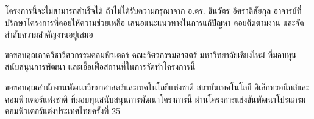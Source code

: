   
  \iffalse
    \begin{dedication}
      This document is dedicated to all Chiang Mai University students.
      
      Dedication page is optional.
    \end{dedication}
  \fi %
  
  \begin{acknowledgments}
    โครงการนี้จะไม่สามารถสำเร็จได้ ถ้าไม่ได้รับความกรุณาจาก อ.ดร. ชินวัตร อิศราดิสัยกุล 
    อาจารย์ที่ปรึกษาโครงการที่คอยให้ความช่วยเหลือ เสนอแนะแนวทางในการแก้ปัญหา 
    คอยติดตามงาน และจัดลำดับความสำคัญงานอยู่เสมอ

    ขอขอบคุณภาควิชาวิศวกรรมคอมพิวเตอร์ คณะวิศวกรรมศาสตร์ มหาวิทยาลัยเชียงใหม่ 
    ที่มอบทุนสนับสนุนการพัฒนา และเอื้อเฟื้อสถานที่ในการจัดทำโครงการนี้

    ขอขอบคุณสำนักงานพัฒนาวิทยาศาสตร์และเทคโนโลยีแห่งชาติ สถาบันเทคโนโลยี
    อิเล็กทรอนิกส์และคอมพิวเตอร์แห่งชาติ ที่มอบทุนสนับสนุนการพัฒนาโครงการนี้ 
    ผ่านโครงการแข่งขันพัฒนาโปรแกรมคอมพิวเตอร์แต่งประเทศไทยครั้้งที่ 25
    
  \end{acknowledgments}%
\fi %

\contentspage

\ifproject
  \figurelistpage
  
\fi %



